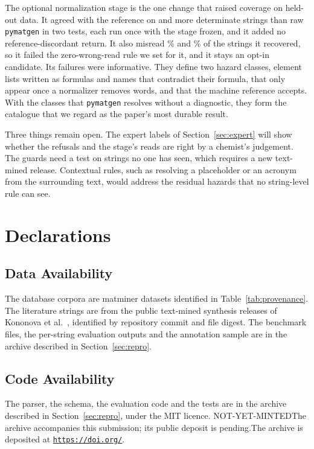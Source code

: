 \documentclass[10pt,journal]{IEEEtran}
\newcommand{\pmg}{\texttt{pymatgen}\xspace}
\def\depositdoiPLACEHOLDER{NOT-YET-MINTED}
\newcommand{\depositis}[2]{\ifx\depositdoi\depositdoiPLACEHOLDER #1\else #2\fi}
\newcommand{\depositdoilink}{\href{https://doi.org/\depositdoi}{\texttt{https://doi.org/\depositdoi}}}
\begin{document}
The optional normalization stage is the one change that raised coverage on held-out data. It agreed with the reference on \StOneGainPmg{} and \StTwoGainPmg{} more determinate strings than raw \pmg in two tests, each run once with the stage frozen, and it added no reference-discordant return. It also misread \StOneWrongPct\% and \StTwoWrongPct\% of the strings it recovered, so it failed the zero-wrong-read rule we set for it, and it stays an opt-in candidate. Its failures were informative. They define two hazard classes, element lists written as formulas and names that contradict their formula, that only appear once a normalizer removes words, and that the machine reference accepts. With the \NHazClasses{} classes that \pmg resolves without a diagnostic, they form the catalogue that we regard as the paper's most durable result.

Three things remain open. The expert labels of Section~\ref{sec:expert} will show whether the refusals and the stage's reads are right by a chemist's judgement. The guards need a test on strings no one has seen, which requires a new text-mined release. Contextual rules, such as resolving a placeholder or an acronym from the surrounding text, would address the residual hazards that no string-level rule can see.

\section*{Declarations}

\subsection*{Data Availability}
The database corpora are matminer datasets identified in Table~\ref{tab:provenance}. The literature strings are from the public text-mined synthesis releases of Kononova et al.~\cite{kononova2019textmined,textminedrepo2023}, identified by repository commit and file digest. The benchmark files, the per-string evaluation outputs and the annotation sample are in the archive described in Section~\ref{sec:repro}.

\subsection*{Code Availability}
The parser, the schema, the evaluation code and the tests are in the archive described in Section~\ref{sec:repro}, under the MIT licence. \depositis{The archive accompanies this submission; its public deposit is pending.}{The archive is deposited at \depositdoilink.}
\end{document}
